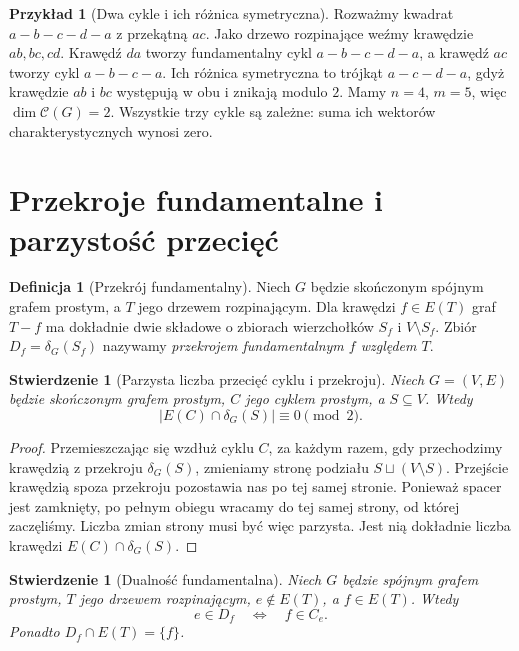 \documentclass[11pt,a4paper]{report}
\numberwithin{equation}{section}
\theoremstyle{plain}
\newtheorem{stwierdzenie}[twierdzenie]{Stwierdzenie}
\theoremstyle{definition}
\newtheorem{definicja}[twierdzenie]{Definicja}
\newtheorem{przyklad}[twierdzenie]{Przykład}
\theoremstyle{remark}
\begin{document}
\begin{przyklad}[Dwa cykle i ich różnica symetryczna]
Rozważmy kwadrat $a-b-c-d-a$ z przekątną $ac$.
Jako drzewo rozpinające weźmy krawędzie
$ab,bc,cd$. Krawędź $da$ tworzy fundamentalny
cykl $a-b-c-d-a$, a krawędź $ac$ tworzy
cykl $a-b-c-a$. Ich różnica symetryczna to
trójkąt $a-c-d-a$, gdyż krawędzie $ab$ i $bc$
występują w obu i znikają modulo $2$.
Mamy $n=4$, $m=5$, więc $\dim\mathcal C(G)=2$.
Wszystkie trzy cykle są zależne: suma ich
wektorów charakterystycznych wynosi zero.
\end{przyklad}

\section{Przekroje fundamentalne i parzystość przecięć}
\label{sec:tg-przekroje-fundamentalne}

\begin{definicja}[Przekrój fundamentalny]
Niech $G$ będzie skończonym spójnym grafem
prostym, a $T$ jego drzewem rozpinającym.
Dla krawędzi $f\in E(T)$ graf $T-f$
ma dokładnie dwie składowe o zbiorach
wierzchołków $S_f$ i $V\setminus S_f$.
Zbiór $D_f=\delta_G(S_f)$ nazywamy
\emph{przekrojem fundamentalnym $f$
względem $T$}.
\end{definicja}

\begin{stwierdzenie}[Parzysta liczba przecięć cyklu i przekroju]
Niech $G=(V,E)$ będzie skończonym grafem prostym,
$C$ jego cyklem prostym, a $S\subseteq V$.
Wtedy
\[
|E(C)\cap\delta_G(S)|\equiv0\pmod2.
\]
\end{stwierdzenie}

\begin{proof}
Przemieszczając się wzdłuż cyklu $C$, za
każdym razem, gdy przechodzimy krawędzią
z przekroju $\delta_G(S)$, zmieniamy
stronę podziału $S\sqcup(V\setminus S)$.
Przejście krawędzią spoza przekroju pozostawia
nas po tej samej stronie. Ponieważ spacer
jest zamknięty, po pełnym obiegu wracamy
do tej samej strony, od której zaczęliśmy.
Liczba zmian strony musi być więc parzysta.
Jest nią dokładnie liczba krawędzi
$E(C)\cap\delta_G(S)$.
\end{proof}

\begin{stwierdzenie}[Dualność fundamentalna]
Niech $G$ będzie spójnym grafem prostym,
$T$ jego drzewem rozpinającym, $e\notin E(T)$,
a $f\in E(T)$. Wtedy
\[
e\in D_f\quad\Longleftrightarrow\quad f\in C_e.
\]
Ponadto $D_f\cap E(T)=\{f\}$.
\end{stwierdzenie}
\end{document}
